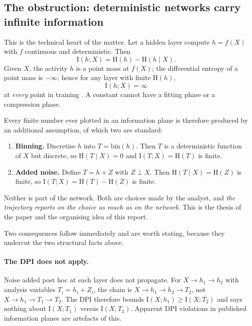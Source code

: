 \documentclass[11pt,a4paper]{article}
\newcommand{\I}{\mathrm{I}}
\newcommand{\HH}{\mathrm{H}}
\begin{document}
\subsection{The obstruction: deterministic networks carry infinite information}
\label{sec:infinite}

This is the technical heart of the matter. Let a hidden layer compute
$h=f(X)$ with $f$ continuous and deterministic. Then
\begin{equation}
  \I(h;X) = \HH(h) - \HH(h \mid X).
\end{equation}
Given $X$, the activity $h$ is a point mass at $f(X)$; the differential entropy
of a point mass is $-\infty$; hence for any layer with finite $\HH(h)$,
\begin{equation}
  \boxed{\ \I(h;X) = \infty\ }
  \label{eq:infinite}
\end{equation}
at \emph{every} point in training \citep{laughlin1981simple,tishby2015deep}. A
constant cannot have a fitting phase or a compression phase.

Every finite number ever plotted in an information plane is therefore produced by
an additional assumption, of which two are standard:
\begin{enumerate}[label=(\roman*),topsep=2pt,itemsep=1pt]
  \item \textbf{Binning.} Discretise $h$ into $T=\mathrm{bin}(h)$. Then $T$ is a
    deterministic function of $X$ but discrete, so $\HH(T \mid X)=0$ and
    $\I(T;X)=\HH(T)$ is finite.
  \item \textbf{Added noise.} Define $T=h+Z$ with $Z \perp X$. Then
    $\HH(T \mid X) = \HH(Z)$ is finite, so $\I(T;X) = \HH(T)-\HH(Z)$ is finite.
\end{enumerate}
Neither is part of the network. Both are choices made by the analyst, and
\emph{the trajectory reports on the choice as much as on the network}. This is
the thesis of the paper and the organising idea of this report.

Two consequences follow immediately and are worth stating, because they undercut
the two structural facts above.

\paragraph{The DPI does not apply.} Noise added post hoc at each layer does not
propagate. For $X \to h_1 \to h_2$ with analysis variables $T_i = h_i + Z_i$, the
chain is $X \to h_1 \to h_2 \to T_2$, not $X\to h_1 \to T_1 \to T_2$. The DPI
therefore bounds $\I(X;h_1) \ge \I(X;T_2)$ and says nothing about
$\I(X;T_1)$ versus $\I(X;T_2)$. Apparent DPI violations in published information
planes are artefacts of this.
\end{document}
